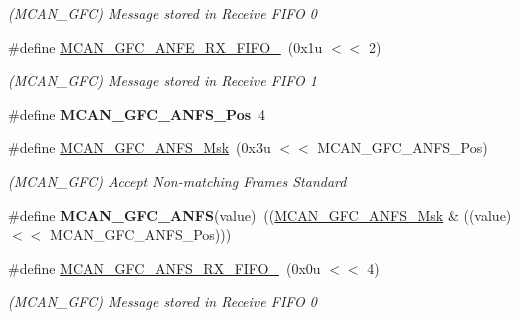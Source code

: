 \begin{DoxyCompactItemize}
\begin{DoxyCompactList}\small\item\em (M\+C\+A\+N\+\_\+\+G\+FC) Message stored in Receive F\+I\+FO 0 \end{DoxyCompactList}\item 
\mbox{\label{group__SAME70__MCAN_ga14fa270466065df4811e54997ffa8b07}} 
\#define \mbox{\hyperlink{group__SAME70__MCAN_ga14fa270466065df4811e54997ffa8b07}{M\+C\+A\+N\+\_\+\+G\+F\+C\+\_\+\+A\+N\+F\+E\+\_\+\+R\+X\+\_\+\+F\+I\+F\+O\+\_}}~(0x1u $<$$<$ 2)
\begin{DoxyCompactList}\small\item\em (M\+C\+A\+N\+\_\+\+G\+FC) Message stored in Receive F\+I\+FO 1 \end{DoxyCompactList}\item 
\mbox{\label{group__SAME70__MCAN_ga7ea2457c1207d21da7e634419903041b}} 
\#define {\bfseries M\+C\+A\+N\+\_\+\+G\+F\+C\+\_\+\+A\+N\+F\+S\+\_\+\+Pos}~4
\item 
\mbox{\label{group__SAME70__MCAN_gaeda55c2a0d35e6d7e7ee9b7f74090180}} 
\#define \mbox{\hyperlink{group__SAME70__MCAN_gaeda55c2a0d35e6d7e7ee9b7f74090180}{M\+C\+A\+N\+\_\+\+G\+F\+C\+\_\+\+A\+N\+F\+S\+\_\+\+Msk}}~(0x3u $<$$<$ M\+C\+A\+N\+\_\+\+G\+F\+C\+\_\+\+A\+N\+F\+S\+\_\+\+Pos)
\begin{DoxyCompactList}\small\item\em (M\+C\+A\+N\+\_\+\+G\+FC) Accept Non-\/matching Frames Standard \end{DoxyCompactList}\item 
\mbox{\label{group__SAME70__MCAN_gad87166a921b0ab51e061307039e429ae}} 
\#define {\bfseries M\+C\+A\+N\+\_\+\+G\+F\+C\+\_\+\+A\+N\+FS}(value)~((\mbox{\hyperlink{group__SAMV71__MCAN_gaeda55c2a0d35e6d7e7ee9b7f74090180}{M\+C\+A\+N\+\_\+\+G\+F\+C\+\_\+\+A\+N\+F\+S\+\_\+\+Msk}} \& ((value) $<$$<$ M\+C\+A\+N\+\_\+\+G\+F\+C\+\_\+\+A\+N\+F\+S\+\_\+\+Pos)))
\item 
\mbox{\label{group__SAME70__MCAN_gafdea21fd7aeb4be26407aa1e77c68d7b}} 
\#define \mbox{\hyperlink{group__SAME70__MCAN_gafdea21fd7aeb4be26407aa1e77c68d7b}{M\+C\+A\+N\+\_\+\+G\+F\+C\+\_\+\+A\+N\+F\+S\+\_\+\+R\+X\+\_\+\+F\+I\+F\+O\+\_}}~(0x0u $<$$<$ 4)
\begin{DoxyCompactList}\small\item\em (M\+C\+A\+N\+\_\+\+G\+FC) Message stored in Receive F\+I\+FO 0 \end{DoxyCompactList}\item 

\end{DoxyCompactItemize}
